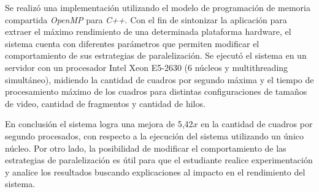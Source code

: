 Se realizó una implementación utilizando el modelo de programación de memoria
compartida \emph{OpenMP} para \emph{C++}. Con el fin de sintonizar la aplicación
para extraer el máximo rendimiento de una determinada plataforma hardware, el
sistema cuenta con diferentes parámetros que permiten modificar el
comportamiento de sus estrategias de paralelización. Se ejecutó el sistema en un
servidor con un procesador Intel Xeon E5-2630 (6 núcleos y multithreading
simultáneo), midiendo la cantidad de cuadros por segundo máxima y el tiempo de
procesamiento máximo de los cuadros para distintas configuraciones de tamaños de
video, cantidad de fragmentos y cantidad de hilos.

En conclusión el sistema logra una mejora de 5,42$x$ en la cantidad de cuadros
por segundo procesados, con respecto a la ejecución del sistema utilizando un
único núcleo. Por otro lado, la posibilidad de modificar el comportamiento de
las estrategias de paralelización es útil para que el estudiante realice
experimentación y analice los resultados buscando explicaciones al impacto en el
rendimiento del sistema.

\vfill
\pagebreak
